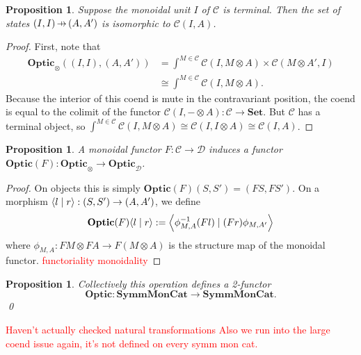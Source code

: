 \documentclass[11pt,a4paper]{article}
\theoremstyle{plain}
\newtheorem{proposition}[theorem]{Proposition}
\theoremstyle{definition}
\newtheorem{remark}[theorem]{Remark}
\newcommand{\C}{\mathscr{C}}
\newcommand{\D}{\mathscr{D}}
\newcommand{\Set}{\mathbf{Set}}
\newcommand{\SymmMonCat}{\mathbf{SymmMonCat}}
\newcommand{\Optic}{\mathbf{Optic}}
\newcommand{\rep}[2]{{\ensuremath \left\langle #1 \mid #2 \right\rangle}}
\newcommand{\hto}{\ensuremath{\,\mathaccent\shortmid\rightarrow\,}}
\newcommand{\todo}[1]{\textcolor{red}{\small #1}}
\begin{document}
\begin{proposition}
  Suppose the monoidal unit $I$ of $\C$ is terminal. Then the set of states $(I, I) \hto (A, A')$ is isomorphic to $\C(I, A)$.
\end{proposition}
\begin{proof}
  First, note that
  \begin{align*}
    \Optic_\otimes((I,I), (A,A'))
    &= \int^{M \in \C} \C(I, M \otimes A) \times \C(M \otimes A', I) \\
    &\cong \int^{M \in \C} \C(I, M \otimes A).
  \end{align*}
  Because the interior of this coend is mute in the contravariant position, the coend is equal to the colimit of the functor $\C(I, - \otimes A) : \C \to \Set$. But $\C$ has a terminal object, so $\int^{M \in \C} \C(I, M \otimes A) \cong \C(I, I \otimes A) \cong \C(I, A)$.
\end{proof}


\begin{proposition}\label{prop-change-of-action-monoidal}
  A monoidal functor $F : \C \to \D$ induces a functor $\Optic(F) : \Optic_\otimes \to \Optic_\D$.
\end{proposition}
\begin{proof}
  On objects this is simply $\Optic(F)(S, S') = (FS, FS')$. On a morphism $\rep{l}{r} : (S, S') \to (A, A')$, we define
  \begin{align*}
    \Optic(F)\rep{l}{r} := \rep{\phi^{-1}_{M,A} (Fl)}{(Fr) \phi_{M,A'}}
  \end{align*}
  where $\phi_{M,A} : FM \otimes FA \to F(M \otimes A)$ is the structure map of the monoidal functor.
  \todo{functoriality}
  \todo{monoidality}
\end{proof}

\begin{proposition}\label{prop-optic-functor}
  Collectively this operation defines a 2-functor \[\Optic : \SymmMonCat \to \SymmMonCat.\] \qed
\end{proposition}
\todo{Haven't actually checked natural transformations}
\todo{Also we run into the large coend issue again, it's not defined on every symm mon cat.}
\end{document}

